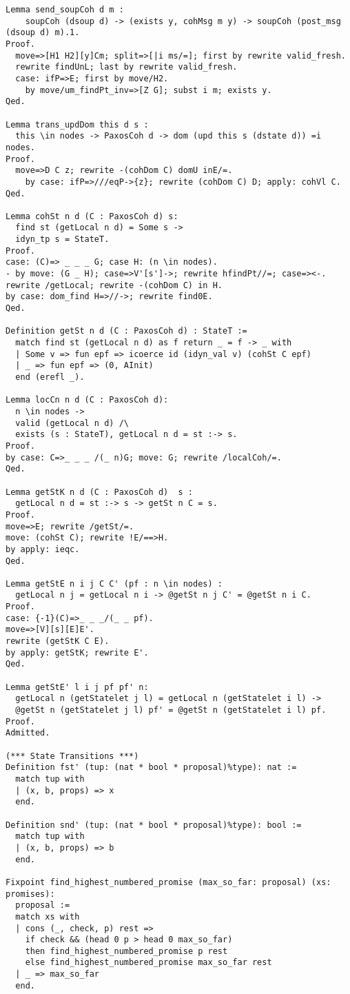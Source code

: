 \begin{landscape}
\begin{multicols*}{2}
\begin{lstlisting}[style=SourceCodeListing]
Lemma send_soupCoh d m :
    soupCoh (dsoup d) -> (exists y, cohMsg m y) -> soupCoh (post_msg (dsoup d) m).1.
Proof.
  move=>[H1 H2][y]Cm; split=>[|i ms/=]; first by rewrite valid_fresh.
  rewrite findUnL; last by rewrite valid_fresh.
  case: ifP=>E; first by move/H2.
    by move/um_findPt_inv=>[Z G]; subst i m; exists y.
Qed.

Lemma trans_updDom this d s :
  this \in nodes -> PaxosCoh d -> dom (upd this s (dstate d)) =i nodes.
Proof.
  move=>D C z; rewrite -(cohDom C) domU inE/=.
    by case: ifP=>///eqP->{z}; rewrite (cohDom C) D; apply: cohVl C.
Qed.

Lemma cohSt n d (C : PaxosCoh d) s:
  find st (getLocal n d) = Some s ->
  idyn_tp s = StateT.
Proof.
case: (C)=> _ _ _ G; case H: (n \in nodes).
- by move: (G _ H); case=>V'[s']->; rewrite hfindPt//=; case=><-.
rewrite /getLocal; rewrite -(cohDom C) in H.
by case: dom_find H=>//->; rewrite find0E.
Qed.

Definition getSt n d (C : PaxosCoh d) : StateT :=
  match find st (getLocal n d) as f return _ = f -> _ with
  | Some v => fun epf => icoerce id (idyn_val v) (cohSt C epf)
  | _ => fun epf => (0, AInit)
  end (erefl _).

Lemma locCn n d (C : PaxosCoh d):
  n \in nodes ->
  valid (getLocal n d) /\
  exists (s : StateT), getLocal n d = st :-> s.
Proof.
by case: C=>_ _ _ /(_ n)G; move: G; rewrite /localCoh/=.
Qed.

Lemma getStK n d (C : PaxosCoh d)  s :
  getLocal n d = st :-> s -> getSt n C = s.
Proof.
move=>E; rewrite /getSt/=.
move: (cohSt C); rewrite !E/==>H.
by apply: ieqc.
Qed.

Lemma getStE n i j C C' (pf : n \in nodes) :
  getLocal n j = getLocal n i -> @getSt n j C' = @getSt n i C.
Proof.
case: {-1}(C)=>_ _ _/(_ _ pf).
move=>[V][s][E]E'.
rewrite (getStK C E).
by apply: getStK; rewrite E'.
Qed.

Lemma getStE' l i j pf pf' n:
  getLocal n (getStatelet j l) = getLocal n (getStatelet i l) ->
  @getSt n (getStatelet j l) pf' = @getSt n (getStatelet i l) pf.
Proof.
Admitted.

(*** State Transitions ***)
Definition fst' (tup: (nat * bool * proposal)%type): nat :=
  match tup with
  | (x, b, props) => x
  end.

Definition snd' (tup: (nat * bool * proposal)%type): bool :=
  match tup with
  | (x, b, props) => b
  end.

Fixpoint find_highest_numbered_promise (max_so_far: proposal) (xs: promises):
  proposal :=
  match xs with
  | cons (_, check, p) rest =>
    if check && (head 0 p > head 0 max_so_far)
    then find_highest_numbered_promise p rest
    else find_highest_numbered_promise max_so_far rest
  | _ => max_so_far
  end.


\end{lstlisting}
\end{multicols*}
\end{landscape}
